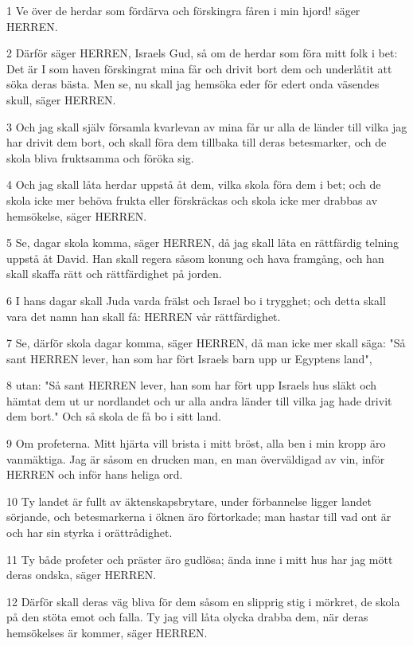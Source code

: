 \par 1 Ve över de herdar som fördärva och förskingra fåren i min hjord! säger HERREN.
\par 2 Därför säger HERREN, Israels Gud, så om de herdar som föra mitt folk i bet: Det är I som haven förskingrat mina får och drivit bort dem och underlåtit att söka deras bästa. Men se, nu skall jag hemsöka eder för edert onda väsendes skull, säger HERREN.
\par 3 Och jag skall själv församla kvarlevan av mina får ur alla de länder till vilka jag har drivit dem bort, och skall föra dem tillbaka till deras betesmarker, och de skola bliva fruktsamma och föröka sig.
\par 4 Och jag skall låta herdar uppstå åt dem, vilka skola föra dem i bet; och de skola icke mer behöva frukta eller förskräckas och skola icke mer drabbas av hemsökelse, säger HERREN.
\par 5 Se, dagar skola komma, säger HERREN, då jag skall låta en rättfärdig telning uppstå åt David. Han skall regera såsom konung och hava framgång, och han skall skaffa rätt och rättfärdighet på jorden.
\par 6 I hans dagar skall Juda varda frälst och Israel bo i trygghet; och detta skall vara det namn han skall få: HERREN vår rättfärdighet.
\par 7 Se, därför skola dagar komma, säger HERREN, då man icke mer skall säga: "Så sant HERREN lever, han som har fört Israels barn upp ur Egyptens land",
\par 8 utan: "Så sant HERREN lever, han som har fört upp Israels hus släkt och hämtat dem ut ur nordlandet och ur alla andra länder till vilka jag hade drivit dem bort." Och så skola de få bo i sitt land.
\par 9 Om profeterna. Mitt hjärta vill brista i mitt bröst, alla ben i min kropp äro vanmäktiga. Jag är såsom en drucken man, en man överväldigad av vin, inför HERREN och inför hans heliga ord.
\par 10 Ty landet är fullt av äktenskapsbrytare, under förbannelse ligger landet sörjande, och betesmarkerna i öknen äro förtorkade; man hastar till vad ont är och har sin styrka i orättrådighet.
\par 11 Ty både profeter och präster äro gudlösa; ända inne i mitt hus har jag mött deras ondska, säger HERREN.
\par 12 Därför skall deras väg bliva för dem såsom en slipprig stig i mörkret, de skola på den stöta emot och falla. Ty jag vill låta olycka drabba dem, när deras hemsökelses är kommer, säger HERREN.
